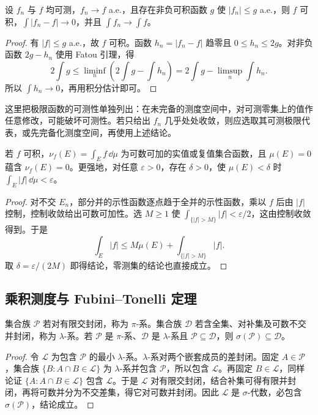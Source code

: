 \begin{theorem}[控制收敛定理]\label{thm:y0-dominated}
设 $f_n$ 与 $f$ 均可测，$f_n\to f$ a.e.，且存在非负可积函数 $g$ 使 $|f_n|\le g$ a.e.，则 $f$ 可积，$\int|f_n-f|\to0$，并且 $\int f_n\to\int f$。
\end{theorem}
\begin{proof}
有 $|f|\le g$ a.e.，故 $f$ 可积。函数 $h_n=|f_n-f|$ 趋零且 $0\le h_n\le2g$。对非负函数 $2g-h_n$ 使用 Fatou 引理，得
\[
 2\int g\le\liminf_n\left(2\int g-\int h_n\right)
            =2\int g-\limsup_n\int h_n.
\]
所以 $\int h_n\to0$，再用积分估计即可。
\end{proof}
这里把极限函数的可测性单独列出：在未完备的测度空间中，对可测零集上的值作任意修改，可能破坏可测性。若只给出 $f_n$ 几乎处处收敛，则应选取其可测极限代表，或先完备化测度空间，再使用上述结论。

\begin{proposition}[积分的可数可加性与绝对连续性]\label{prop:y0-integral-ac}
若 $f$ 可积，$\nu_f(E)=\int_Ef\,\dd\mu$ 为可数可加的实值或复值集合函数，且 $\mu(E)=0$ 蕴含 $\nu_f(E)=0$。更强地，对任意 $\varepsilon>0$，存在 $\delta>0$，使 $\mu(E)<\delta$ 时 $\int_E|f|\,\dd\mu<\varepsilon$。
\end{proposition}
\begin{proof}
对不交 $E_n$，部分并的示性函数逐点趋于全并的示性函数，乘以 $f$ 后由 $|f|$ 控制，控制收敛给出可数可加性。选 $M\ge1$ 使 $\int_{\{|f|>M\}}|f|<\varepsilon/2$，这由控制收敛得到。于是
\[
 \int_E|f|\le M\mu(E)+\int_{\{|f|>M\}}|f|.
\]
取 $\delta=\varepsilon/(2M)$ 即得结论，零测集的结论也直接成立。
\end{proof}

\subsection{乘积测度与 Fubini--Tonelli 定理}
\begin{lemma}[$\pi$--$\lambda$ 原理]\label{lem:y0-pi-lambda}
集合族 $\mathcal P$ 若对有限交封闭，称为 $\pi$-系。集合族 $\mathcal D$ 若含全集、对补集及可数不交并封闭，称为 $\lambda$-系。若 $\mathcal P$ 是 $\pi$-系、$\mathcal D$ 是 $\lambda$-系且 $\mathcal P\subseteq\mathcal D$，则 $\sigma(\mathcal P)\subseteq\mathcal D$。
\end{lemma}
\begin{proof}
令 $\mathcal L$ 为包含 $\mathcal P$ 的最小 $\lambda$-系。$\lambda$-系对两个嵌套成员的差封闭。固定 $A\in\mathcal P$，集合族 $\{B:A\cap B\in\mathcal L\}$ 为 $\lambda$-系并包含 $\mathcal P$，所以包含 $\mathcal L$。再固定 $B\in\mathcal L$，同样论证 $\{A:A\cap B\in\mathcal L\}$ 包含 $\mathcal L$。于是 $\mathcal L$ 对有限交封闭，结合补集可得有限并封闭，再将可数并分为不交差集，得它对可数并封闭。因此 $\mathcal L$ 是 $\sigma$-代数，必包含 $\sigma(\mathcal P)$，结论成立。
\end{proof}


